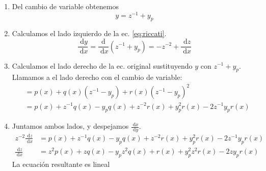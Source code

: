 \documentclass[a4paper]{article}
\newcommand{\dif}[1]{\;\mathrm{d}#1}
\begin{document}
\begin{enumerate}
    \item Del cambio de variable obtenemos
    \begin{equation*}
        y = z^{-1} + y_{p}
    \end{equation*}

    \item Calculamos el lado izquierdo de la ec. \eqref{eq:riccati}.
    \begin{equation*}
        \frac{\dif{y}}{\dif{x}} = \frac{\mathrm{d}}{\dif{x}} \left( z^{-1} + y_p \right) = -z^{-2} + \frac{\dif{z}}{\dif{x}} 
    \end{equation*}

    \item Calculamos el lado derecho de la ec. original sustituyendo $y$ con $z^{-1} + y_p$.
    Llamamos a el lado derecho con el cambio de variable:
    \begin{align*}
       &= p(x) + q(x) (z^{-1} - y_p) + r(x) (z^{-1} - y_p)^{2} \\
       &= p(x) + z^{-1} q(x) - y_p q(x) + z^{-2} r(x) + y^{2}_{p} r(x) - 2 z^{-1} y_p r(x)
    \end{align*}

    \item Juntamos ambos lados, y despejamos $\frac{\dif{x}}{\dif{y}}$.
    \begin{align*}
        z^{-2}  \frac{\dif{z}}{\dif{x}} &= p(x) + z^{-1} q(x) - y_p q(x) + z^{-2} r(x) + y^{2}_{p} r(x) - 2 z^{-1} y_p r(x) \\
        \frac{\dif{z}}{\dif{x}} &= z^{2} p(x) + z q(x) - y_p z^{2} q(x) + r(x) + y^{2}_{p} z^{2} r(x) - 2 z y_p r(x)
    \end{align*}
    La ecuación resultante es lineal 
\end{enumerate}
\end{document}
